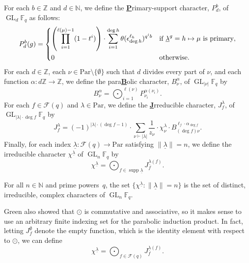 \documentclass[Unicode,ALCO]{cedram}
\DeclareMathOperator{\GL}{GL}
\DeclareMathOperator{\supp}{supp}
\newcommand{\F}{\mathbb{F}}
\newcommand{\CF}{\mathcal{F}}
\newcommand{\N}{\mathbb{N}}
\newcommand{\Z}{\mathbb{Z}}
\newcommand{\eps}{\epsilon}
\newcommand{\Par}{\text{Par}}
\newcommand{\ulambda}{{\underline{\lambda}}}
\newcommand{\uline}[1]{{\underline{#1}}}
\newcommand{\te}{\theta}
\begin{document}
For each $b \in \Z$ and $d \in \N$, we define the \uline{\textbf{P}}rimary-support character, $P_d^b$, of $\GL_d \F_q$ as follows:
\begin{equation}
\label{P_chars}
P_d^b (g) = \begin{dcases} \left ( \prod_{i=1}^{\ell(\mu) - 1} (1-t^i) \right ) \cdot \sum_{i=1}^{\deg h} \te(\eps_{\deg h}^{\ell_h})^{q^i b} & \text{if } \ulambda^g = h \mapsto \mu \text{ is primary}, \\ 0 & \text{otherwise.} \end{dcases}
\end{equation}
For each \(d \in \Z\), each $\nu \in \Par \setminus \{\emptyset\}$ such that \(d\) divides every part of \(\nu\), and each function $\alpha : d \Z \to \Z$, we define the para\uline{\textbf{B}}olic character, $B_\nu^\alpha$, of $\GL_{|\nu|} \F_q$ by
\begin{equation}
\label{B_chars}
B_\nu^\alpha = \bigodot_{i = 1}^{\ell(\nu)} P_{\nu_i}^{\alpha(\nu_i)}. \end{equation}
For each $f \in \CF (q)$ and $\lambda \in \Par$, we define the \uline{\textbf{J}}rreducible character, $J_f^\lambda$, of $\GL_{|\lambda| \cdot \deg f} \F_q$
by
\begin{equation}
\label{jrreducible}
J_f^\lambda
=
(-1)^{|\lambda| \cdot (\deg f - 1)} \cdot \sum_{\nu \vdash |\lambda|} \frac{1}{z_\nu} \cdot \chi^\lambda_\nu \cdot B^{\ell_f \cdot \alpha_{\deg f}}_{(\deg f) \nu}.
\end{equation}
Finally, for each index $\ulambda : \CF (q) \to \Par$ satisfying $\| \ulambda \| = n$, we define the irreducible character $\chi^\ulambda$ of $\GL_n \F_q$
by
\begin{equation} \label{grand_finale} \chi^{\ulambda} = \bigodot_{f \in \supp \ulambda} J_f^{\ulambda(f)}. \end{equation}

\begin{theorem}
\label{greens_main_thm}
For all \(n \in \N\) and prime powers~\(q\), the set $\{ \chi^\ulambda : \| \ulambda \| = n\}$ is the set of distinct, irreducible, complex characters of $\GL_n \F_q$.
\end{theorem}

Green also showed that $\odot$ is commutative and associative, so it makes sense to use an arbitrary finite indexing set for the parabolic induction product. In fact, letting $J_f^\emptyset$ denote the empty function, which is the identity element with respect to $\odot$, we can define
\begin{equation}
\chi^\ulambda = \bigodot_{f \in \CF (q)} J_f^{\ulambda(f)}.
\end{equation}
\end{document}
